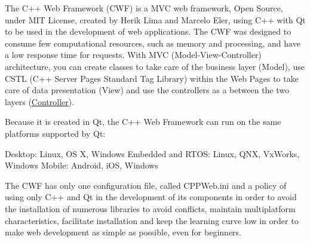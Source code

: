 ​​\+The C++ Web Framework (C\+WF) is a M\+VC web framework, Open Source, under M\+IT License, created by Herik Lima and Marcelo Eler, using C++ with Qt to be used in the development of web applications. The C\+WF was designed to consume few computational resources, such as memory and processing, and have a low response time for requests. With M\+VC (Model-\/\+View-\/\+Controller) architecture, you can create classes to take care of the business layer (Model), use C\+S\+TL (C++ Server Pages Standard Tag Library) within the Web Pages to take care of data presentation (View) and use the controllers as a between the two layers (\hyperlink{class_controller}{Controller}).

Because it is created in Qt, the C++ Web Framework can run on the same platforms supported by Qt\+:

Desktop\+: Linux, OS X, Windows Embedded and R\+T\+OS\+: Linux, Q\+NX, Vx\+Works, Windows Mobile\+: Android, i\+OS, Windows

The C\+WF has only one configuration file, called C\+P\+P\+Web.\+ini and a policy of using only C++ and Qt in the development of its components in order to avoid the installation of numerous libraries to avoid conflicts, maintain multiplatform characteristics, facilitate installation and keep the learning curve low in order to make web development as simple as possible, even for beginners. 